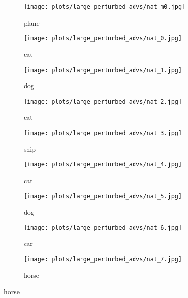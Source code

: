 \documentclass{article}
\begin{document}
\captionsetup[subfigure]{labelformat=empty}
\begin{figure}[t]
    \centering
    \begin{subfigure}{0.8\linewidth}
    \centering
    \begin{minipage}[b]{0.10\linewidth}
        \texttt{[image: plots/large\_perturbed\_advs/nat\_m0.jpg]}\vspace{-2mm}\caption{plane}
    \end{minipage}
    \begin{minipage}[b]{0.10\linewidth}
        \texttt{[image: plots/large\_perturbed\_advs/nat\_0.jpg]}\vspace{-2mm}\caption{cat}
    \end{minipage}
    \begin{minipage}[b]{0.10\linewidth}
        \texttt{[image: plots/large\_perturbed\_advs/nat\_1.jpg]}\vspace{-2mm}\caption{dog}
    \end{minipage}
        \begin{minipage}[b]{0.10\linewidth}
        \texttt{[image: plots/large\_perturbed\_advs/nat\_2.jpg]}\vspace{-2mm}\caption{cat}
    \end{minipage}
        \begin{minipage}[b]{0.10\linewidth}
        \texttt{[image: plots/large\_perturbed\_advs/nat\_3.jpg]}\vspace{-2mm}\caption{ship}
    \end{minipage}
        \begin{minipage}[b]{0.10\linewidth}
        \texttt{[image: plots/large\_perturbed\_advs/nat\_4.jpg]}\vspace{-2mm}\caption{cat}
    \end{minipage}
        \begin{minipage}[b]{0.10\linewidth}
        \texttt{[image: plots/large\_perturbed\_advs/nat\_5.jpg]}\vspace{-2mm}\caption{dog}
    \end{minipage}
        \begin{minipage}[b]{0.10\linewidth}
        \texttt{[image: plots/large\_perturbed\_advs/nat\_6.jpg]}\vspace{-2mm}\caption{car}
    \end{minipage}
        \begin{minipage}[b]{0.10\linewidth}
        \texttt{[image: plots/large\_perturbed\_advs/nat\_7.jpg]}\vspace{-2mm}\caption{horse}
    \end{minipage}
    \end{subfigure}


\end{figure}
\end{document}
